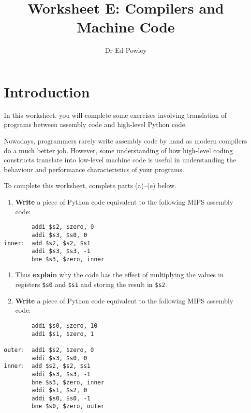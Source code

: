 \documentclass{../../../fal_assignment}
\title{Worksheet E: Compilers and Machine Code}
\author{Dr Ed Powley}
\begin{document}
\maketitle
{}

\section*{Introduction}

In this worksheet, you will complete some exercises involving translation of programs between assembly code and high-level Python code.

Nowadays, programmers rarely write assembly code by hand as modern compilers do a much better job.
However, some understanding of how high-level coding constructs translate into low-level machine code
is useful in understanding the behaviour and performance characteristics of your programs.

To complete this worksheet, complete parts (a)--(e) below.

\begin{enumerate}[label=(\alph*)]
	\item \textbf{Write} a piece of Python code equivalent to the following MIPS assembly code:
\end{enumerate}

\begin{lstlisting}
        addi $s2, $zero, 0
        addi $s3, $s0, 0
inner:  add $s2, $s2, $s1
        addi $s3, $s3, -1
        bne $s3, $zero, inner
\end{lstlisting}

\begin{enumerate}[resume,label=(\alph*)]
	\item Thus \textbf{explain} why the code has the effect of multiplying the values in registers \lstinline{$s0} and \lstinline{$s1}
	and storing the result in \lstinline{$s2}.
	\item \textbf{Write} a piece of Python code equivalent to the following MIPS assembly code:
\end{enumerate}

\begin{lstlisting}
        addi $s0, $zero, 10
        addi $s1, $zero, 1

outer:  addi $s2, $zero, 0
        addi $s3, $s0, 0
inner:  add $s2, $s2, $s1
        addi $s3, $s3, -1
        bne $s3, $zero, inner
        addi $s1, $s2, 0
        addi $s0, $s0, -1
        bne $s0, $zero, outer
\end{lstlisting}
\end{document}
